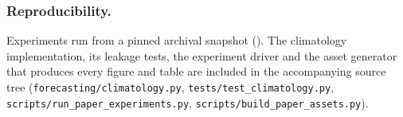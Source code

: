 \documentclass[runningheads]{llncs}
\begin{document}


\subsubsection*{Reproducibility.}
Experiments run from a pinned archival snapshot (\AsOf{}). The climatology
implementation, its leakage tests, the experiment driver and the asset
generator that produces every figure and table are included in the
accompanying source tree (\texttt{forecasting/climatology.py},
\texttt{tests/test\_climatology.py},
\texttt{scripts/run\_paper\_experiments.py},
\texttt{scripts/build\_paper\_assets.py}).



\end{document}
